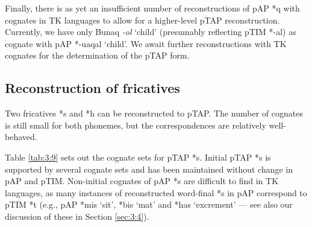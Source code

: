Finally, there is as yet an insufficient number of reconstructions of pAP *q with cognates in TK languages to allow for a higher-level pTAP reconstruction. Currently, we have only Bunaq \textit{{}-ol} `child' (presumably reflecting pTIM *-al) as cognate with pAP *-uaqal `child'. We await further reconstructions with TK cognates for the determination of the pTAP form.

\subsection{Reconstruction of fricatives}
Two fricatives *s and *h can be reconstructed to pTAP. The number of cognates is still small for both phonemes, but the correspondences are relatively well-behaved. 

Table \ref{tab:3:9} sets out the cognate sets for pTAP *s. Initial pTAP *s is supported by several cognate sets and has been maintained without change in pAP and pTIM. Non-initial cognates of pAP *s are difficult to find in TK languages, as many instances of reconstructed word-final *s in pAP correspond to pTIM *t (e.g., pAP *mis `sit', *bis `mat' and *has `excrement'  ---  see also our discussion of these in Section \ref{sec:3:4}).
 

